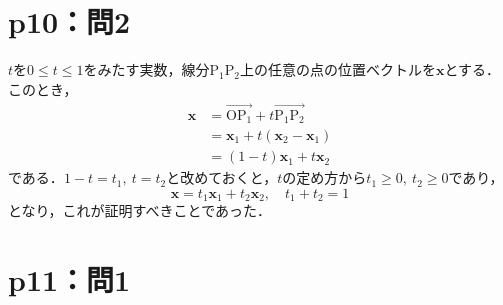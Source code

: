\section*{p10：問2}

\begin{tproof}
  $t$を$0 \le t \le 1$をみたす実数，線分$\mathrm{P_1 P_2}$上の任意の点の位置ベクトルを$\bm{x}$とする．
  このとき，
  \begin{align*}
    \bm{x} & = \overrightarrow{\mathrm{O P_1}}+t\overrightarrow{\mathrm{P_1 P_2}} \\
           & = \bm{x}_1 + t (\bm{x}_2 - \bm{x}_1)                                 \\
           & = (1-t) \bm{x}_1 + t \bm{x}_2
  \end{align*}
  である．$1-t = t_1,~t=t_2$と改めておくと，$t$の定め方から$t_1 \ge 0,~t_2 \ge 0$であり，
  \[
    \bm{x}= t_1 \bm{x}_1 + t_2 \bm{x}_2 ,\quad t_1 + t_2 =1
  \]
  となり，これが証明すべきことであった．
\end{tproof}


\section*{p11：問1}

